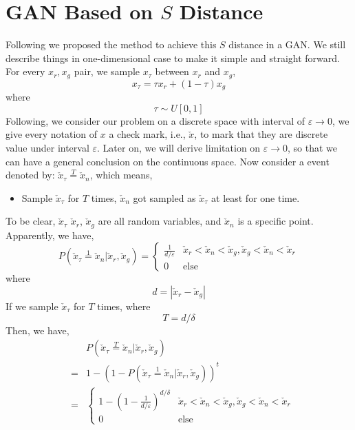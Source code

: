 \documentclass[letterpaper]{article} %
\begin{document}
\section{GAN Based on $S$ Distance}
Following we proposed the method to achieve this $S$ distance in a GAN.
We still describe things in one-dimensional case to make it simple and straight forward.
For every $x_{r}, x_{g}$ pair, we sample $x_{\tau}$ between $x_{r}$ and $x_g$,
\begin{equation}\label{x-epsilon}
  x_{\tau} = \tau x_{r} + (1-\tau) x_g
\end{equation}
where
\begin{equation}\label{epsilon}
  \tau \sim U[0,1]
\end{equation}
Following, we consider our problem on a discrete space with interval of $\varepsilon\rightarrow 0$, we give every notation of $x$ a check mark, i.e., $\check{x}$, to mark that they are discrete value under interval $\varepsilon$.
Later on, we will derive limitation on $\varepsilon\rightarrow 0$, so that we can have a general conclusion on the continuous space.
Now consider a event denoted by: $\check{x}_\tau\overset{T}{=}\check{x}_n$, which means,
\begin{itemize}
  \item Sample $\check{x}_\tau$ for $T$ times, $\check{x}_n$ got sampled as $\check{x}_\tau$ at least for one time.
\end{itemize}
To be clear, $\check{x}_\tau$ $\check{x}_r$, $\check{x}_g$ are all random variables, and $\check{x}_n$ is a specific point.
Apparently, we have,
\begin{equation}\label{p-epsilon-pr-pg}
    P(\check{x}_\tau\overset{1}{=}\check{x}_n|\check{x}_r,\check{x}_g)=
    \begin{cases}
        \frac{1}{d/\varepsilon} &\mbox{$\check{x}_r<\check{x}_n<\check{x}_g,\check{x}_g<\check{x}_n<\check{x}_r$}\\
        0 &\mbox{else}
    \end{cases}
\end{equation}
where
\begin{equation}\label{d}
  d=|\check{x}_r-\check{x}_g|
\end{equation}
If we sample $\check{x}_\tau$ for $T$ times, where
\begin{equation}\label{T}
  T = d/{\delta}
\end{equation}
Then, we have,
\begin{eqnarray}\label{p-tau}
    && P(\check{x}_\tau\overset{T}{=}\check{x}_n|\check{x}_r,\check{x}_g) \nonumber\\
    &=& 1 - (1-P(\check{x}_\tau\overset{1}{=}\check{x}_n|\check{x}_r,\check{x}_g))^t \nonumber\\
    &=&
    \begin{cases}
        1 - (1-\frac{1}{d/\varepsilon})^{d/\delta} &\mbox{$\check{x}_r<\check{x}_n<\check{x}_g,\check{x}_g<\check{x}_n<\check{x}_r$}\\
        0 &\mbox{else}
    \end{cases}
\end{eqnarray}
\end{document}
